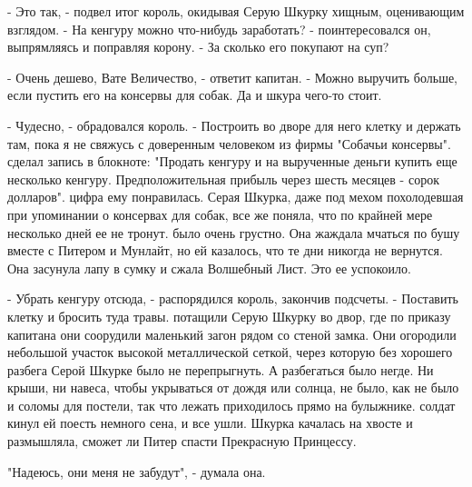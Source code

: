 \par- Это так, - подвел итог король, окидывая Серую Шкурку хищным, 
оценивающим взглядом. - На кенгуру можно что-нибудь заработать? - 
поинтересовался он, выпрямляясь и поправляя корону. - За сколько его 
покупают на суп?
\par- Очень дешево, Вате Величество, - ответит капитан. - Можно 
выручить больше, если пустить его на консервы для собак. Да и шкура 
чего-то стоит.
\par- Чудесно, - обрадовался король. - Построить во дворе для него 
клетку и держать там, пока я не свяжусь с доверенным человеком из 
фирмы "Собачьи консервы".
 сделал запись в блокноте: "Продать кенгуру и на вырученные 
деньги купить еще несколько кенгуру. Предположительная прибыль через 
шесть месяцев - сорок долларов".
 цифра ему понравилась. Серая Шкурка, даже под мехом 
похолодевшая при упоминании о консервах для собак, все же поняла, что 
по крайней мере несколько дней ее не тронут.
 было очень грустно. Она жаждала мчаться по бушу вместе с 
Питером и Мунлайт, но ей казалось, что те дни никогда не вернутся. Она 
засунула лапу в сумку и сжала Волшебный Лист. Это ее успокоило.
\par- Убрать кенгуру отсюда, - распорядился король, закончив подсчеты. 
- Поставить клетку и бросить туда травы.
 потащили Серую Шкурку во двор, где по приказу капитана они 
соорудили маленький загон рядом со стеной замка. Они огородили 
небольшой участок высокой металлической сеткой, через которую без 
хорошего разбега Серой Шкурке было не перепрыгнуть. А разбегаться было 
негде. Ни крыши, ни навеса, чтобы укрываться от дождя или солнца, не 
было, как не было и соломы для постели, так что лежать приходилось 
прямо на булыжнике.
 солдат кинул ей поесть немного сена, и все ушли.
 Шкурка качалась на хвосте и размышляла, сможет ли Питер 
спасти Прекрасную Принцессу.
\par"Надеюсь, они меня не забудут", - думала она.
\par
